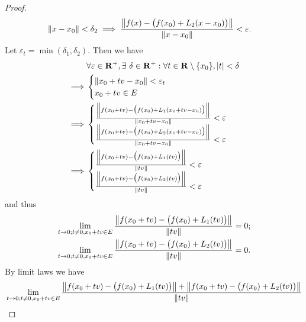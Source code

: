 \begin{proof}
\begin{align*}
         & \norm*{x - x_0} < \delta_2 \implies \frac{\norm*{f(x) - \big(f(x_0) + L_2(x - x_0)\big)}}{\norm*{x - x_0}} < \varepsilon.
    \end{align*}
    Let \(\varepsilon_t = \min(\delta_1, \delta_2)\).
    Then we have
    \begin{align*}
                 & \forall \varepsilon \in \R^+, \exists\ \delta \in \R^+ : \forall t \in \R \setminus \{x_0\}, \abs{t} < \delta \\
        \implies & \begin{cases}
                       \norm*{x_0 + tv - x_0} < \varepsilon_t \\
                       x_0 + tv \in E
                   \end{cases}                                                                        \\
        \implies & \begin{cases}
                       \frac{\norm*{f(x_0 + tv) - \big(f(x_0) + L_1(x_0 + tv - x_0)\big)}}{\norm*{x_0 + tv - x_0}} < \varepsilon \\
                       \frac{\norm*{f(x_0 + tv) - \big(f(x_0) + L_2(x_0 + tv - x_0)\big)}}{\norm*{x_0 + tv - x_0}} < \varepsilon
                   \end{cases}                                           \\
        \implies & \begin{cases}
                       \frac{\norm*{f(x_0 + tv) - \big(f(x_0) + L_1(tv)\big)}}{\norm*{tv}} < \varepsilon \\
                       \frac{\norm*{f(x_0 + tv) - \big(f(x_0) + L_2(tv)\big)}}{\norm*{tv}} < \varepsilon
                   \end{cases}
    \end{align*}
    and thus
    \begin{align*}
         & \lim_{t \to 0 ; t \neq 0, x_0 + tv \in E} \frac{\norm*{f(x_0 + tv) - \big(f(x_0) + L_1(tv)\big)}}{\norm*{tv}} = 0; \\
         & \lim_{t \to 0 ; t \neq 0, x_0 + tv \in E} \frac{\norm*{f(x_0 + tv) - \big(f(x_0) + L_2(tv)\big)}}{\norm*{tv}} = 0.
    \end{align*}
    By limit laws we have
    \begin{align*}
         & \lim_{t \to 0 ; t \neq 0, x_0 + tv \in E} \frac{\norm*{f(x_0 + tv) - \big(f(x_0) + L_1(tv)\big)} + \norm*{f(x_0 + tv) - \big(f(x_0) + L_2(tv)\big)}}{\norm*{tv}} \\

\end{align*}
\end{proof}
